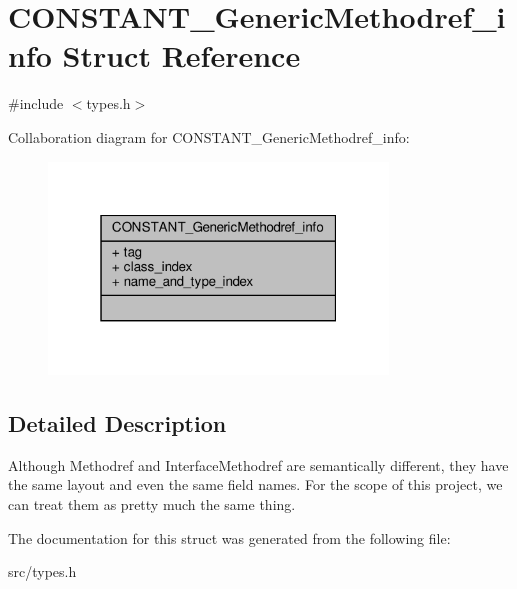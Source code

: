 \hypertarget{structCONSTANT__GenericMethodref__info}{}\section{C\+O\+N\+S\+T\+A\+N\+T\+\_\+\+Generic\+Methodref\+\_\+info Struct Reference}
\label{structCONSTANT__GenericMethodref__info}


{\ttfamily \#include $<$types.\+h$>$}



Collaboration diagram for C\+O\+N\+S\+T\+A\+N\+T\+\_\+\+Generic\+Methodref\+\_\+info\+:\nopagebreak
\begin{figure}[H]
\begin{center}
\leavevmode
\includegraphics[width=256pt]{structCONSTANT__GenericMethodref__info__coll__graph}
\end{center}
\end{figure}


\subsection{Detailed Description}
Although Methodref and Interface\+Methodref are semantically different, they have the same layout and even the same field names. For the scope of this project, we can treat them as pretty much the same thing. 

The documentation for this struct was generated from the following file\+:\begin{DoxyCompactItemize}
\item 
src/types.\+h\end{DoxyCompactItemize}
